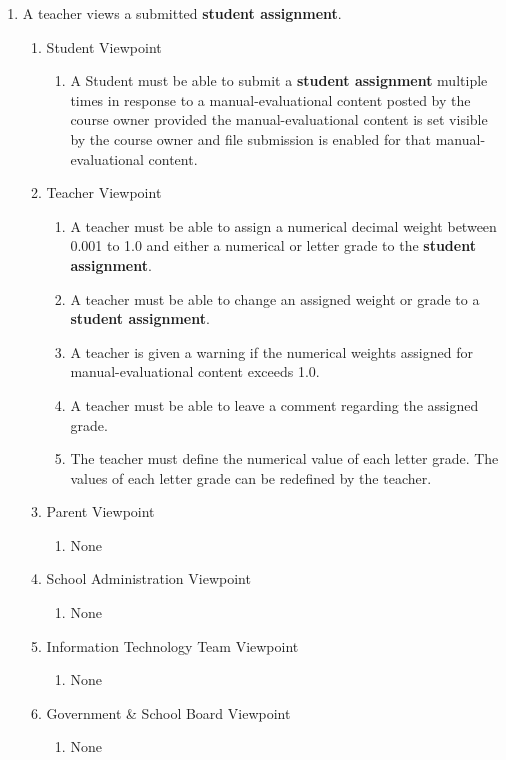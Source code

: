 \documentclass[]{article}
\begin{document}
\begin{enumerate}[{BE}1.]
	\item A teacher views a submitted \textbf{student assignment}.
	\begin{enumerate}[{VP2}.1]
		\item Student Viewpoint
			\begin{enumerate}
				\item A Student must be able to submit a \textbf{student assignment}
multiple times in response to a manual-evaluational content posted by the course
owner provided the manual-evaluational content is set visible by the course
owner and file submission is enabled for that manual-evaluational content.
			\end{enumerate}
		\item Teacher Viewpoint
			\begin{enumerate}
				\item A teacher must be able to assign a numerical decimal weight between
0.001 to 1.0 and either a numerical or letter grade to the \textbf{student
assignment}.
				\item A teacher must be able to change an assigned weight or grade to a
\textbf{student assignment}.
				\item A teacher is given a warning if the numerical weights assigned for
manual-evaluational content exceeds 1.0.
				\item A teacher must be able to leave a comment regarding the assigned
grade.
				\item The teacher must define the numerical value of each letter grade. The
values of each letter grade can be redefined by the teacher.
			\end{enumerate}
		\item Parent Viewpoint
			\begin{enumerate}
				\item None
			\end{enumerate}
		\item School Administration Viewpoint
			\begin{enumerate}
				\item None
			\end{enumerate}
		\item Information Technology Team Viewpoint
			\begin{enumerate}
				\item None
			\end{enumerate}
		\item Government \& School Board Viewpoint
			\begin{enumerate}
				\item None
			\end{enumerate}
	\end{enumerate}


\end{enumerate}
\end{document}
